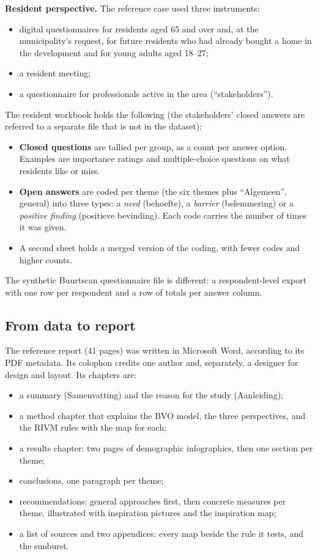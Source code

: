\textbf{Resident perspective.} The reference case used three instruments:
\begin{itemize}
\item digital questionnaires for residents aged 65 and over and, at the municipality's request, for future residents who had already bought a home in the development and for young adults aged 18--27;
\item a resident meeting;
\item a questionnaire for professionals active in the area (\textquotedblleft{}stakeholders\textquotedblright{}).
\end{itemize}
The resident workbook holds the following (the stakeholders' closed answers are referred to a separate file that is not in the dataset):
\begin{itemize}
\item \textbf{Closed questions} are tallied per group, as a count per answer option. Examples are importance ratings and multiple-choice questions on what residents like or miss.
\item \textbf{Open answers} are coded per theme (the six themes plus \textquotedblleft{}Algemeen\textquotedblright{}, general) into three types: a \textit{need} (behoefte), a \textit{barrier} (belemmering) or a \textit{positive finding} (positieve bevinding). Each code carries the number of times it was given.
\item A second sheet holds a merged version of the coding, with fewer codes and higher counts.
\end{itemize}
The synthetic Buurtscan questionnaire file is different: a respondent-level export with one row per respondent and a row of totals per answer column.

\subsection{From data to report}\label{sec:process-writing}

The reference report (41 pages) was written in Microsoft Word, according to its PDF metadata. Its colophon credits one author and, separately, a designer for design and layout. Its chapters are:
\begin{itemize}
\item a summary (Samenvatting) and the reason for the study (Aanleiding);
\item a method chapter that explains the BVO model, the three perspectives, and the RIVM rules with the map for each;
\item a results chapter: two pages of demographic infographics, then one section per theme;
\item conclusions, one paragraph per theme;
\item recommendations: general approaches first, then concrete measures per theme, illustrated with inspiration pictures and the inspiration map;
\item a list of sources and two appendices: every map beside the rule it tests, and the sunburst.
\end{itemize}

